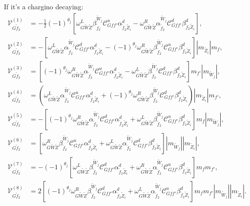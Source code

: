 \documentclass[final,3p,times,pdflatex]{elsarticle}
\begin{document}
If it's a chargino decaying:
\begin{align}
\mathcal{V}_{G \tilde{f}_2}^{(1)} &= -\frac{1}{2}(-1)^{\theta_j}[\omega_{G \tilde{W} \tilde{Z}}^L \beta_{\tilde{f}_2}^{\tilde{W}_j}\mathcal{C}_{G f f'}^u \alpha_{\tilde{f}_2 \tilde{Z}_i}^{d} - \omega_{G \tilde{W} \tilde{Z}}^R \alpha_{\tilde{f}_2}^{\tilde{W}_j} \mathcal{C}_{G f f'}^d \beta_{\tilde{f}_2 \tilde{Z}_i}^{d}],\\
\mathcal{V}_{G \tilde{f}_2}^{(2)} &= -[\omega_{G \tilde{W} \tilde{Z}}^L \alpha_{\tilde{f}_2}^{\tilde{W}_j} \mathcal{C}_{G f f'}^d \alpha_{\tilde{f}_2 \tilde{Z}_i}^{d} - (-1)^{\theta_j} \omega_{G \tilde{W} \tilde{Z}}^R \beta_{\tilde{f}_2}^{\tilde{W}_j} \mathcal{C}_{G f f'}^u \beta_{\tilde{f}_2 \tilde{Z}_i}^{d}]|m_{\tilde{Z}_i}|m_{f}, \\
\mathcal{V}_{G \tilde{f}_2}^{(3)} &= [(-1)^{\theta_j}\omega_{G \tilde{W} \tilde{Z}}^R \alpha_{\tilde{f}_2}^{\tilde{W}_j} \mathcal{C}_{G f f'}^u \alpha_{\tilde{f}_2 \tilde{Z}_i}^{d} - \omega_{G \tilde{W} \tilde{Z}}^L \beta_{\tilde{f}_2}^{\tilde{W}_j} \mathcal{C}_{G f f'}^d \beta_{\tilde{f}_2 \tilde{Z}_i}^{d}]m_{f'}|m_{\tilde{W}_j}| ,\\
\mathcal{V}_{G \tilde{f}_2}^{(4)} &= (\omega_{G \tilde{W} \tilde{Z}}^L \alpha_{\tilde{f}_2}^{\tilde{W}_j} \mathcal{C}_{G f f'}^u \alpha_{\tilde{f}_2 \tilde{Z}_i}^{d} + (-1)^{\theta_j} \omega_{G \tilde{W} \tilde{Z}}^R \beta_{\tilde{f}_2}^{\tilde{W}_j} \mathcal{C}_{G f f'}^d \beta_{\tilde{f}_2 \tilde{Z}_i}^{d})|m_{\tilde{Z}_i}|m_{f'}, \\
\mathcal{V}_{G \tilde{f}_2}^{(5)} &= -[(-1)^{\theta_j}\omega_{G \tilde{W} \tilde{Z}}^R \alpha_{\tilde{f}_2}^{\tilde{W}_j} \mathcal{C}_{G f f'}^d \alpha_{\tilde{f}_2 \tilde{Z}_i}^{d} + \omega_{G \tilde{W} \tilde{Z}}^L \beta_{\tilde{f}_2}^{\tilde{W}_j} \mathcal{C}_{G f f'}^u \beta_{\tilde{f}_2 \tilde{Z}_i}^{d}]m_{f}|m_{\tilde{W}_j}|, \\
\mathcal{V}_{G \tilde{f}_2}^{(6)} &= [\omega_{G \tilde{W} \tilde{Z}}^R \beta_{\tilde{f}_2}^{\tilde{W}_j} \mathcal{C}_{G f f'}^u \alpha_{\tilde{f}_2 \tilde{Z}_i}^{d} + \omega_{G \tilde{W} \tilde{Z}}^L \alpha_{\tilde{f}_2}^{\tilde{W}_j} \mathcal{C}_{G f f'}^d \beta_{\tilde{f}_2 \tilde{Z}_i}^{d}]|m_{\tilde{W}_j}||m_{\tilde{Z}_i}| ,\\
\mathcal{V}_{G \tilde{f}_2}^{(7)} &= -(-1)^{\theta_j}[\omega_{G \tilde{W} \tilde{Z}}^L \beta_{\tilde{f}_2}^{\tilde{W}_j} \mathcal{C}_{G f f'}^d \alpha_{\tilde{f}_2 \tilde{Z}_i}^{d} + \omega_{G \tilde{W} \tilde{Z}}^R \alpha_{\tilde{f}_2}^{\tilde{W}_j} \mathcal{C}_{G f f'}^u \beta_{\tilde{f}_2 \tilde{Z}_i}^{d}]m_{f}m_{f'}, \\
\mathcal{V}_{G \tilde{f}_2}^{(8)} &= 2[(-1)^{\theta_j}\omega_{G \tilde{W} \tilde{Z}}^R \beta_{\tilde{f}_2}^{\tilde{W}_j} \mathcal{C}_{G f f'}^d \alpha_{\tilde{f}_2 \tilde{Z}_i}^{d} + \omega_{G \tilde{W} \tilde{Z}}^L \alpha_{\tilde{f}_2}^{\tilde{W}_j} \mathcal{C}_{G f f'}^u \beta_{\tilde{f}_2 \tilde{Z}_i}^{d}]m_{f}m_{f'}|m_{\tilde{W}_j}||m_{\tilde{Z}_i}|.
\end{align}
\end{document}
